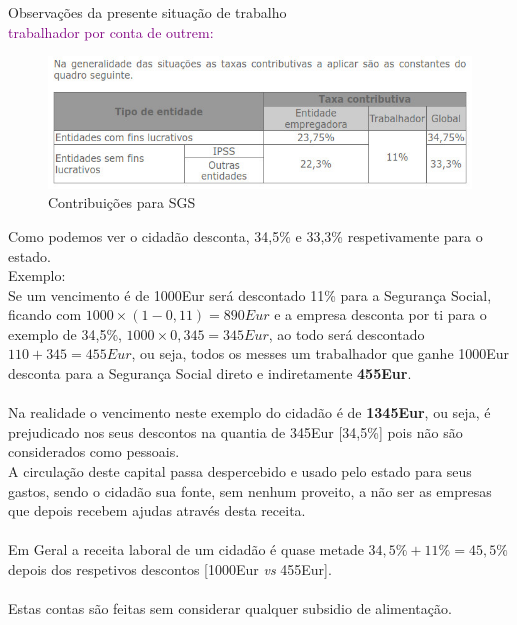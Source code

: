 {\Large Observações da presente situação de trabalho} \\

\textup{\large \textcolor{purple}{trabalhador por conta de outrem:}}\\
\begin{figure}[H]
\flushleft
\includegraphics[scale=.5]{./image/SGS/Contribuicoes_1.jpg}
\caption{Contribuições para SGS}
\end{figure}\par
Como podemos ver o cidadão desconta, 34,5\% e 33,3\% respetivamente para o estado.\\
Exemplo:\\ 
Se um vencimento é de 1000Eur será descontado 11\% para a Segurança Social, ficando com $1000\times (1-0,11)=890Eur$ e a empresa desconta por ti para o exemplo de 34,5\%, $1000\times 0,345=345Eur$, ao todo será descontado $110+345=455Eur$, ou seja, todos os messes um trabalhador que ganhe 1000Eur desconta para a Segurança Social direto e indiretamente \textbf{455Eur}.\\ \\
Na realidade o vencimento neste exemplo do cidadão é de \textbf{1345Eur}, ou seja, é prejudicado nos seus descontos na quantia de 345Eur [34,5\%] pois não são considerados como pessoais.\\
A circulação deste capital passa despercebido e usado pelo estado para seus gastos, sendo o cidadão sua fonte, sem nenhum proveito, a não ser as empresas que depois recebem ajudas através desta receita.\\ \\
Em Geral a receita laboral de um cidadão é quase metade $34,5\%+11\%=45,5\%$ depois dos respetivos descontos [1000Eur \textit{vs} 455Eur].\\ \\
Estas contas são feitas sem considerar qualquer subsidio de alimentação.\\ \\

